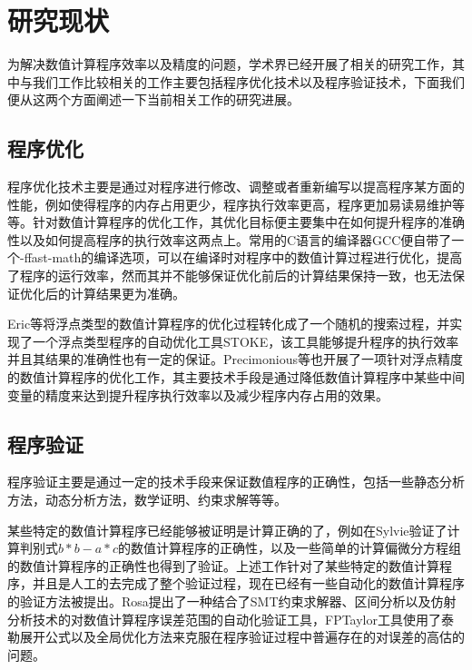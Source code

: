 \section{研究现状}
为解决数值计算程序效率以及精度的问题，学术界已经开展了相关的研究工作，其中与我们工作比较相关的工作主要包括程序优化技术以及程序验证技术，下面我们便从这两个方面阐述一下当前相关工作的研究进展。
\subsection{程序优化}

程序优化技术\cite{Sedgewick:1984:ALG:42466}主要是通过对程序进行修改、调整或者重新编写以提高程序某方面的性能，例如使得程序的内存占用更少，程序执行效率更高，程序更加易读易维护等等。针对数值计算程序的优化工作，其优化目标便主要集中在如何提升程序的准确性以及如何提高程序的执行效率这两点上。常用的C语言的编译器GCC\cite{Stallman:2009:UGC:1593499}便自带了一个-ffast-math的编译选项，可以在编译时对程序中的数值计算过程进行优化，提高了程序的运行效率，然而其并不能够保证优化前后的计算结果保持一致，也无法保证优化后的计算结果更为准确。

Eric等\cite{Schkufza:2014:SOF:2666356.2594302}将浮点类型的数值计算程序的优化过程转化成了一个随机的搜索过程，并实现了一个浮点类型程序的自动优化工具STOKE，该工具能够提升程序的执行效率并且其结果的准确性也有一定的保证。Precimonious等\cite{6877460}也开展了一项针对浮点精度的数值计算程序的优化工作，其主要技术手段是通过降低数值计算程序中某些中间变量的精度来达到提升程序执行效率以及减少程序内存占用的效果。

\subsection{程序验证}

程序验证\cite{sanghavi2010formal}主要是通过一定的技术手段来保证数值程序的正确性，包括一些静态分析方法\cite{louridas2006static}，动态分析方法\cite{chow2008decoupling}，数学证明、约束求解\cite{hess1997lincs}等等。

某些特定的数值计算程序已经能够被证明是计算正确的了，例如在Sylvie\cite{boldo:inria-00171497}验证了计算判别式$b*b-a*c$的数值计算程序的正确性，以及一些简单的计算偏微分方程组的数值计算程序的正确性也得到了验证\cite{boldo:hal-00649240}。上述工作针对了某些特定的数值计算程序，并且是人工的去完成了整个验证过程，现在已经有一些自动化的数值计算程序的验证方法被提出。Rosa\cite{Darulova:2014:SCR:2578855.2535874}提出了一种结合了SMT约束求解器、区间分析以及仿射分析技术的对数值计算程序误差范围的自动化验证工具，FPTaylor\cite{10.1007/978-3-319-19249-9_33}工具使用了泰勒展开公式以及全局优化方法来克服在程序验证过程中普遍存在的对误差的高估的问题。

